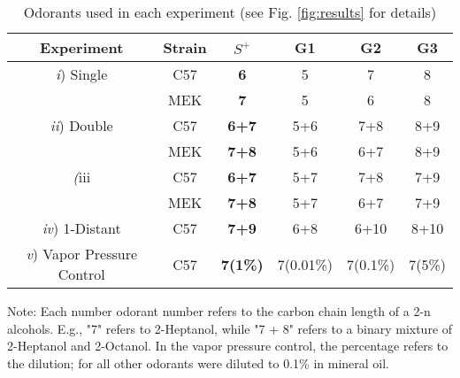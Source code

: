 \begin{table}
\label{tab:design}
    \begin{tabular}{ c | c | c | c | c | c }
        Experiment & Strain & \textbf{$S^+$} & G1 & G2 & G3 \\ 
        \hline
        \textit{i}) Single & C57 & \textbf{6} & 5 & 7 & 8 \\ 
         & MEK & \textbf{7} & 5 & 6 & 8 \\ 
        \hline
        \textit{ii}) Double & C57 & \textbf{6+7} & 5+6 & 7+8 & 8+9 \\ 
         & MEK & \textbf{7+8} & 5+6 & 6+7 & 8+9 \\ 
        \hline
        \textit(iii}) 1-Shared & C57 & \textbf{6+7} & 5+7 & 7+8 & 7+9 \\ 
         & MEK & \textbf{7+8} & 5+7 & 6+7 & 7+9 \\ 
        \hline
        \textit{iv}) 1-Distant & C57 & \textbf{7+9} & 6+8 & 6+10 & 8+10 \\ 
        \hline
        \textit{v}) Vapor Pressure Control & C57 & \textbf{7(1\%)} & 7(0.01\%) & 7(0.1\%) & 7(5\%) \\ 
    \end{tabular}
    \caption{Odorants used in each experiment (see Fig. \ref{fig:results} for details)}
\end{table}
Note: Each number odorant number refers to the carbon chain length of a 2-n alcohols. E.g., "7" refers to 2-Heptanol, while "7 + 8" refers to a binary mixture of 2-Heptanol and 2-Octanol. In the vapor pressure control, the percentage refers to the dilution; for all other odorants were diluted to {0.1\%} in mineral oil.